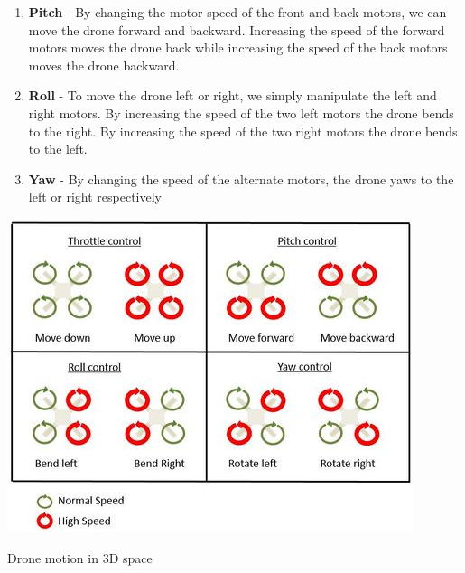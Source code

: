 \documentclass[a4paper,12pt,oneside]{book}
\begin{document}
\begin{itemize}
\begin{itemize}
\begin{enumerate}[I]
            \item\textbf{ Pitch}
            - By changing the motor speed of the front and back motors, we can move the drone forward and backward. Increasing the speed of the forward motors moves the drone back while increasing the speed of the back motors moves the drone backward.
            \item\textbf{ Roll} 
            - To move the drone left or right, we simply manipulate the left and right motors. By increasing the speed of the two left motors the drone bends to the right. By increasing the speed of the two right motors the drone bends to the left.
            \item\textbf{ Yaw} - By changing the speed of the alternate motors, the drone yaws to the left or right respectively
        \end{enumerate}
        \begin{center}
         \includegraphics{roll.png}
        \end{center}
       \begin{center}
           Drone motion in 3D space
       \end{center}
        

\end{itemize}
\end{itemize}
\end{document}
